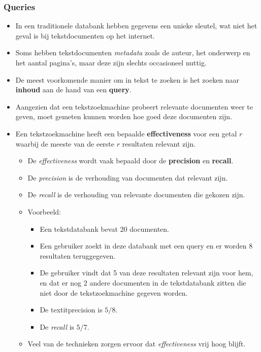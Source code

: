 \subsubsection{Queries}
\begin{itemize}
    \item In een traditionele databank hebben gegevens een unieke sleutel, wat niet het geval is bij tekstdocumenten op het internet.
    \item Soms hebben tekstdocumenten \textit{metadata} zoals de auteur, het onderwerp en het aantal pagina's, maar deze zijn slechts occasioneel nuttig.
    \item De meest voorkomende manier om in tekst te zoeken is het zoeken naar \textbf{inhoud} aan de hand van een \textbf{query}.
    \item Aangezien dat een tekstzoekmachine probeert relevante documenten weer te geven, moet gemeten kunnen worden hoe goed deze documenten zijn.
    \item Een tekstzoekmachine heeft een bepaalde \textbf{effectiveness} voor een getal $r$ waarbij de meeste van de eerste $r$ resultaten relevant zijn. 
    \begin{itemize}
        \item De \textit{effectiveness} wordt vaak bepaald door de \textbf{precision} en \textbf{recall}.
        \item De \textit{precision} is de verhouding van documenten  dat relevant zijn.
        \item De \textit{recall} is de verhouding van relevante documenten die gekozen zijn.
        \item Voorbeeld:
        \begin{itemize}
            \item Een tekstdatabank bevat 20 documenten.
            \item Een gebruiker zoekt in deze databank met een query en er worden 8 resultaten teruggegeven.
            \item De gebruiker vindt dat 5 van deze resultaten relevant zijn voor hem, en dat er nog 2 andere documenten in de tekstdatabank zitten die niet door de tekstzoekmachine gegeven worden.
            \item De textit{precision} is $5/8$.
            \item De \textit{recall} is $5/7$.
        \end{itemize}
        \item Veel van de technieken zorgen ervoor dat \textit{effectiveness} vrij hoog blijft.
    \end{itemize}
\end{itemize}
